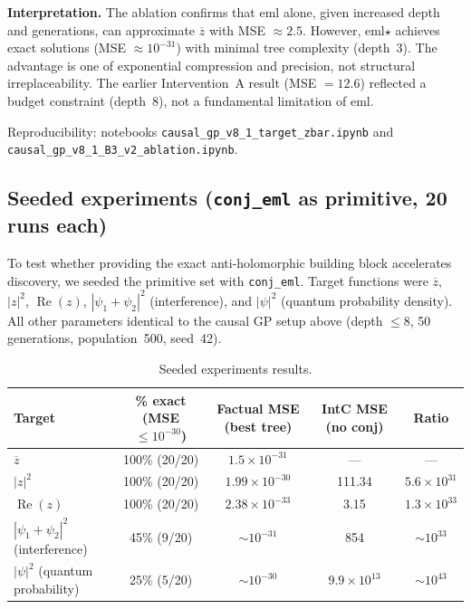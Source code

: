 \documentclass[11pt,a4paper]{article}
\begin{document}
\textbf{Interpretation.} The ablation confirms that eml alone, given increased depth and generations, can approximate $\overline{z}$ with MSE $\approx 2.5$. However, eml$\star$ achieves exact solutions (MSE $\approx 10^{-31}$) with minimal tree complexity (depth~3). The advantage is one of exponential compression and precision, not structural irreplaceability. The earlier Intervention~A result (MSE $= 12.6$) reflected a budget constraint (depth~8), not a fundamental limitation of eml.

Reproducibility: notebooks \texttt{causal\_gp\_v8\_1\_target\_zbar.ipynb} and \texttt{causal\_gp\_v8\_1\_B3\_v2\_ablation.ipynb}.

\subsection{Seeded experiments (\texttt{conj\_eml} as primitive, 20 runs each)}

To test whether providing the exact anti-holomorphic building block accelerates discovery, we seeded the primitive set with \texttt{conj\_eml}. Target functions were $\overline{z}$, $|z|^2$, $\operatorname{Re}(z)$, $|\psi_1 + \psi_2|^2$ (interference), and $|\psi|^2$ (quantum probability density). All other parameters identical to the causal GP setup above (depth $\leq 8$, 50 generations, population~500, seed~42).

\begin{table}[h]
\centering
\begin{tabular}{lcccc}
\toprule
Target & \% exact (MSE $\leq 10^{-30}$) & Factual MSE (best tree) & IntC MSE (no conj) & Ratio \\
\midrule
$\overline{z}$ & 100\% (20/20) & $1.5 \times 10^{-31}$ & --- & --- \\
$|z|^2$ & 100\% (20/20) & $1.99 \times 10^{-30}$ & 111.34 & $5.6 \times 10^{31}$ \\
$\operatorname{Re}(z)$ & 100\% (20/20) & $2.38 \times 10^{-33}$ & 3.15 & $1.3 \times 10^{33}$ \\
$|\psi_1 + \psi_2|^2$ (interference) & 45\% (9/20) & $\sim 10^{-31}$ & 854 & $\sim 10^{33}$ \\
$|\psi|^2$ (quantum probability) & 25\% (5/20) & $\sim 10^{-30}$ & $9.9 \times 10^{13}$ & $\sim 10^{43}$ \\
\bottomrule
\end{tabular}
\caption{Seeded experiments results.}
\end{table}
\end{document}
